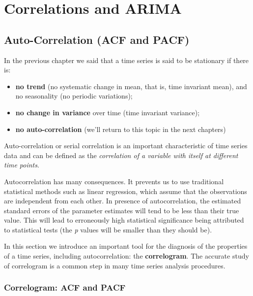 \documentclass[
]{article}
\providecommand{\tightlist}{%
  \setlength{\itemsep}{0pt}\setlength{\parskip}{0pt}}
\begin{document}
\hypertarget{correlations-and-arima}{%
\section{Correlations and ARIMA}\label{correlations-and-arima}}

\hypertarget{auto-correlation-acf-and-pacf}{%
\subsection{Auto-Correlation (ACF and PACF)}\label{auto-correlation-acf-and-pacf}}

In the previous chapter we said that a time series is said to be stationary if there is:

\begin{itemize}
\tightlist
\item
  \textbf{no trend} (no systematic change in mean, that is, time invariant mean), and no seasonality (no periodic variations);
\item
  \textbf{no change in variance} over time (time invariant variance);
\item
  \textbf{no auto-correlation} (we'll return to this topic in the next chapters)
\end{itemize}

Auto-correlation or serial correlation is an important characteristic of time series data and can be defined as the \emph{correlation of a variable with itself at different time points}.

Autocorrelation has many consequences. It prevents us to use traditional statistical methods such as linear regression, which assume that the observations are independent from each other. In presence of autocorrelation, the estimated standard errors of the parameter estimates will tend to be less than their true value. This will lead to erroneously high statistical significance being attributed to statistical tests (the \emph{p} values will be smaller than they should be).

In this section we introduce an important tool for the diagnosis of the properties of a time series, including autocorrelation: the \textbf{correlogram}. The accurate study of correlogram is a common step in many time series analysis procedures.

\hypertarget{correlogram-acf-and-pacf}{%
\subsubsection{Correlogram: ACF and PACF}\label{correlogram-acf-and-pacf}}
\end{document}
